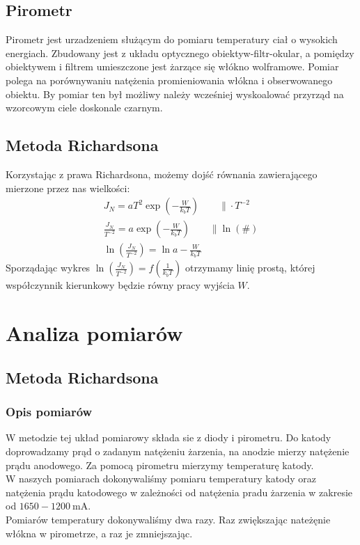 \documentclass[paper=a4, fontsize=12pt]{scrartcl}
\begin{document}
\subsection{Pirometr}
Pirometr jest urzadzeniem służącym do pomiaru temperatury ciał o wysokich energiach. Zbudowany jest z układu optycznego obiektyw-filtr-okular, a pomiędzy obiektywem i filtrem umieszczone jest żarzące się włókno wolframowe. Pomiar polega na porównywaniu natężenia promieniowania włókna i obserwowanego obiektu.
By pomiar ten był możliwy należy wcześniej wyskoalować przyrząd na wzorcowym ciele doskonale czarnym.
\subsection{Metoda Richardsona}
Korzystając z prawa Richardsona, możemy dojść równania zawierającego mierzone przez nas wielkości:
\begin{align*}
J_N=aT^2\exp(-\frac{W}{k_bT})\qquad \|\cdot T^{-2}\\
\frac{J_N}{T^{-2}}=a\exp(-\frac{W}{k_bT})\qquad \|\ln(\#)\\
\ln(\frac{J_N}{T^{-2}})=\ln a-\frac{W}{k_bT}
\end{align*}
Sporządając wykres $\ln(\frac{J_N}{T^{-2}})=f(\frac{1}{k_bT})$ otrzymamy linię prostą, której współczynnik kierunkowy będzie równy pracy wyjścia $W$.\clearpage
\section{Analiza pomiarów}
\subsection{Metoda Richardsona}
\subsubsection{Opis pomiarów}
W metodzie tej układ pomiarowy składa sie z diody i pirometru. Do katody doprowadzamy prąd o zadanym natężeniu żarzenia, na anodzie mierzy natężenie prądu anodowego. Za pomocą pirometru mierzymy temperaturę katody.\\

W naszych pomiarach dokonywaliśmy pomiaru temperatury katody oraz natężenia prądu katodowego w zależności od natężenia pradu żarzenia w zakresie od $1650-1200\:\mathrm{mA}$.\\
Pomiarów temperatury dokonywaliśmy dwa razy. Raz zwiększając nateżęnie włókna w pirometrze, a raz je zmniejszając.
\end{document}
